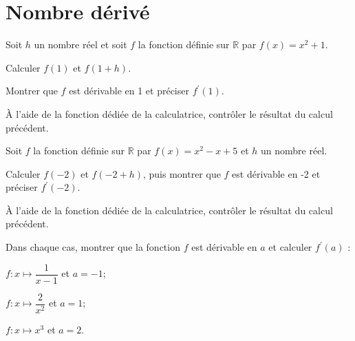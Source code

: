 \documentclass[11pt,a4paper]{article}  %
\begin{document}
	\graphicspath{{img_oblig/}}
	
	\begin{center}
		
		
	\end{center}

\section*{Nombre dérivé}

\exercice{} 

Soit $h$ un nombre réel et soit $f$ la fonction définie sur $\mathbb{R}$ par $f(x)=x^2+1$.
\begin{enumMet}
	\item Calculer $f(1)$ et $f(1+h)$.
	\item Montrer que $f$ est dérivable en 1 et préciser $f^{\prime}(1)$.
	\item À l'aide de la fonction dédiée de la calculatrice, contrôler le résultat du calcul précédent.
\end{enumMet}

\exercice{} 

Soit $f$ la fonction définie sur $\mathbb{R}$ par $f(x)=x^2-x+5$ et $h$ un nombre réel.
\begin{enumMet}
	\item Calculer $f(-2)$ et $f(-2+h)$, puis montrer que $f$ est dérivable en -2 et préciser $f^{\prime}(-2)$.
	\item À l'aide de la fonction dédiée de la calculatrice, contrôler le résultat du calcul précédent.
\end{enumMet}

\exercice{}

Dans chaque cas, montrer que la fonction $f$ est dérivable en $a$ et calculer $f^{\prime}(a)$ :
\begin{enumMet}
	\item $f: x \mapsto \dfrac{1}{x-1}$ et $a=-1$;
	\item $f: x \mapsto \dfrac{2}{x^2}$ et $a=1$;
	\item $f: x \mapsto x^3$ et $a=2$.
\end{enumMet}
\end{document}
